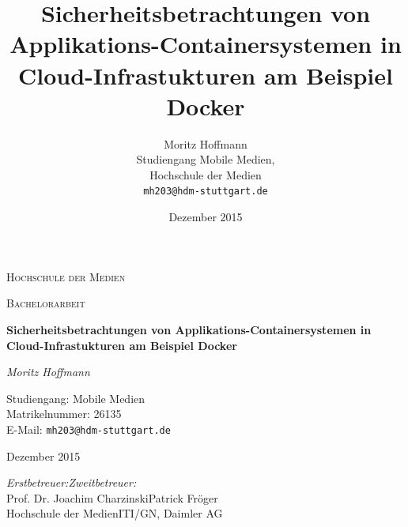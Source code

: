 \documentclass[11pt,a4paper,oneside]{report}
\begin{document}
\begin{titlepage}
	\centering
	{\scshape\LARGE
		Hochschule der Medien
	\par}
	\vspace{1cm}
	{\scshape\Large
		Bachelorarbeit
	\par}
	\vspace{1.5cm}
	{\huge\bfseries
		Sicherheitsbetrachtungen von Applikations-Containersystemen in Cloud-Infrastukturen am Beispiel Docker
	\par}
	\vspace{2cm}
	{\Large\itshape
		Moritz Hoffmann
	\par}
	\vspace{0.5cm}
	{\Large
		Studiengang: Mobile Medien\\
		Matrikelnummer: 26135\\
		E-Mail: \texttt{mh203@hdm-stuttgart.de}
	\par}
	\vspace{1.5cm}
	{\Large Dezember 2015\par}
	\vfill
	{\Large
		\emph{Erstbetreuer:}\hfill\emph{Zweitbetreuer:}\\
		Prof. Dr. Joachim Charzinski\hfill Patrick Fröger\\
		Hochschule der Medien\hfill ITI/GN, Daimler AG
	\par}

\end{titlepage}


\title{Sicherheitsbetrachtungen von Applikations-Containersystemen in Cloud-Infrastukturen am Beispiel Docker}
\author{Moritz Hoffmann\\
  Studiengang Mobile Medien,\\
  Hochschule der Medien\\
  \texttt{mh203@hdm-stuttgart.de}}
\date{Dezember 2015}
\maketitle




\end{document}
